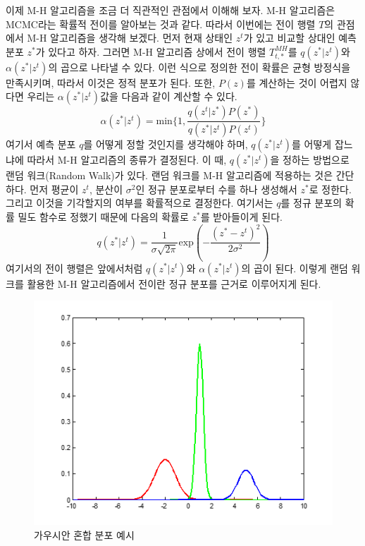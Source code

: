 \documentclass[a4paper]{oblivoir}
\begin{document}
이제 M-H 알고리즘을 조금 더 직관적인 관점에서 이해해 보자. M-H 알고리즘은 MCMC라는 확률적 전이를 알아보는 것과 같다. 따라서 이번에는 전이 행렬 $T$의 관점에서 M-H 알고리즘을 생각해 보겠다. 먼저 현재 상태인 $z^t$가 있고 비교할 상대인 예측 분포 $z^{*}$가 있다고 하자. 그러면 M-H 알고리즘 상에서 전이 행렬 $T_{t,*}^{MH}$를 $q(z^{*}|z^{t})$와 $\alpha(z^{*}|z^{t})$의 곱으로 나타낼 수 있다. 이런 식으로 정의한 전이 확률은 균형 방정식을 만족시키며, 따라서 이것은 정적 분포가 된다. 또한, $P(z)$를 계산하는 것이 어렵지 않다면 우리는 $\alpha(z^{*}|z^{t})$값을 다음과 같이 계산할 수 있다. 
\begin{equation}
\alpha(z^{*}|z^{t}) = \textrm{min} \{ 1, \frac{q(z^{t}|z^{*})P(z^{*})}{q(z^{*}|z^{t})P(z^{t})} \}
\label{eq:10-20}
\end{equation} 
여기서 예측 분포 $q$를 어떻게 정할 것인지를 생각해야 하며, $q(z^{*}|z^{t})$를 어떻게 잡느냐에 따라서 M-H 알고리즘의 종류가 결정된다. 이 때, $q(z^{*}|z^{t})$을 정하는 방법으로 랜덤 워크(Random Walk)가 있다. 랜덤 워크를 M-H 알고리즘에 적용하는 것은 간단하다. 먼저 평균이 $z^{t}$, 분산이 $\sigma^2$인 정규 분포로부터 수를 하나 생성해서 $z^{*}$로 정한다. 그리고 이것을 기각할지의 여부를 확률적으로 결정한다. 여기서는 $q$를 정규 분포의 확률 밀도 함수로 정했기 때문에 다음의 확률로 $z^{*}$를 받아들이게 된다. 
\begin{equation}
q(z^{*}|z^{t}) = \frac{1}{\sigma \sqrt{2 \pi}} \textrm{exp} (-\frac{(z^{*}-z^{t})^{2}}{2\sigma^2})
\label{eq:10-21}
\end{equation}
여기서의 전이 행렬은 앞에서처럼 $q(z^{*}|z^{t})$와 $\alpha(z^{*}|z^{t})$의 곱이 된다. 이렇게 랜덤 워크를 활용한 M-H 알고리즘에서 전이란 정규 분포를 근거로 이루어지게 된다. \\

\begin{figure}[ht] \centering 
\includegraphics[scale=0.7]{fig10_22.png} 
\caption{가우시안 혼합 분포 예시}
\label{fig:10-11-1}
\end{figure}  
\end{document}
